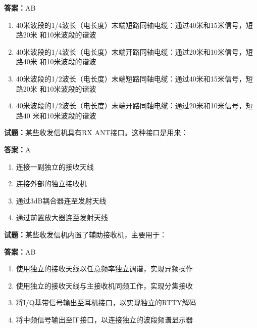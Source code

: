 \documentclass{ctexbook}
\begin{document}
\textbf{答案：}AB 

\begin{enumerate}[leftmargin=3em]
  \item 40米波段的1/4波长（电长度）末端短路同轴电缆：通过40米和15米信号，短路20米
和10米波段的谐波 

  \item 40米波段的1/4波长（电长度）末端开路同轴电缆：通过20米和10米信号，短路40米
和10米波段的谐波 

  \item 40米波段的1/2波长（电长度）末端短路同轴电缆：通过40米和15米信号，短路20米
和10米波段的谐波 

  \item 40米波段的1/2波长（电长度）末端开路同轴电缆：通过20米和10米信号，短路40
米和10米波段的谐波 

\end{enumerate}





\vspace{1em}

\textbf{试题：}某些收发信机具有RX ANT接口。这种接口是用来： 

\textbf{答案：}A 

\begin{enumerate}[leftmargin=3em]
  \item 连接一副独立的接收天线 

  \item 连接外部的独立接收机 

  \item 通过3dB耦合器连至发射天线 

  \item 通过前置放大器连至发射天线 

\end{enumerate}





\vspace{1em}

\textbf{试题：}某些收发信机内置了辅助接收机，主要用于： 

\textbf{答案：}AB 

\begin{enumerate}[leftmargin=3em]
  \item 使用独立的接收天线以任意频率独立调谐，实现异频操作 

  \item 使用独立的接收天线与主接收机同频工作，实现分集接收 

  \item 将I/Q基带信号输出至耳机接口，以实现独立的RTTY解码 

  \item 将中频信号输出至IF接口，以连接独立的波段频谱显示器 


\end{enumerate}
\end{document}
